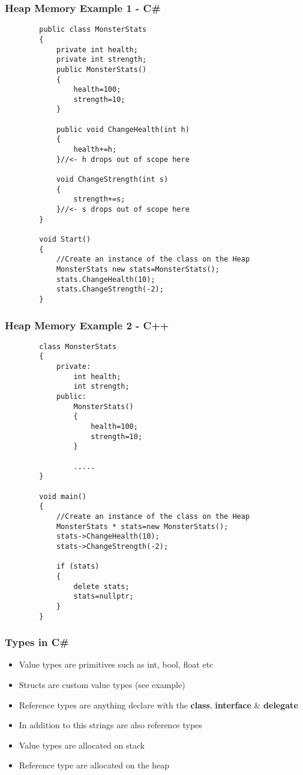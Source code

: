 \begin{frame}[fragile]
	\frametitle{Heap Memory Example 1 - C\#}
	\begin{lstlisting}
		public class MonsterStats
		{
			private int health;
			private int strength;
			public MonsterStats()
			{
				health=100;
				strength=10;
			}
			
			public void ChangeHealth(int h)
			{
				health+=h;
			}//<- h drops out of scope here
			
			void ChangeStrength(int s)
			{
				strength+=s;
			}//<- s drops out of scope here
		}
		
		void Start()
		{		
			//Create an instance of the class on the Heap
			MonsterStats new stats=MonsterStats();
			stats.ChangeHealth(10);
			stats.ChangeStrength(-2);
		}	
	\end{lstlisting}
\end{frame}

\begin{frame}[fragile]
	\frametitle{Heap Memory Example 2 - C++}
	\begin{lstlisting}
		class MonsterStats
		{
			private:
				int health;
				int strength;
			public:
				MonsterStats()
				{
					health=100;
					strength=10;
				}
				
				.....
		}
		
		void main()
		{		
			//Create an instance of the class on the Heap
			MonsterStats * stats=new MonsterStats();
			stats->ChangeHealth(10);
			stats->ChangeStrength(-2);
			
			if (stats)
			{
				delete stats;
				stats=nullptr;
			}
		}
	\end{lstlisting}
\end{frame}

\begin{frame}
  \frametitle{Types in C\#}
  \begin{itemize}
  	\item Value types are primitives such as int, bool, float etc
  	\item Structs are custom value types (see example)
  	\item Reference types are anything declare with the \textbf{class}, \textbf{interface} \& \textbf{delegate}
  	\item In addition to this strings are also reference types
  	\item Value types are allocated on stack
  	\item Reference type are allocated on the heap
  \end{itemize}
\end{frame}

